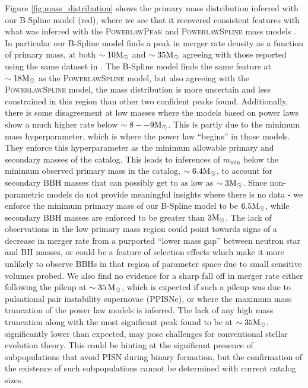 Figure \ref{fig:mass_distribution} shows the primary mass distribution inferred with our B-Spline model (red), where we see that it recovered consistent 
features with what was inferred with the \textsc{PowerlawPeak} and \textsc{PowerlawSpline} mass models \citep{Talbot_2018,o3a_pop,Edelman_2022ApJ,o3b_astro_dist}. 
In particular our B-Spline model finds a peak in merger rate density as a function of primary mass, at both $\sim10{\rm M}_\odot$ and $\sim35{\rm M}_\odot$ agreeing with those 
reported using the same dataset in \citet{o3b_astro_dist}. The B-Spline model finds the same feature at $\sim18{\rm M}_\odot$ as the \textsc{PowerlawSpline} model, but also 
agreeing with the \textsc{PowerlawSpline} model, the mass distribution is more uncertain and less constrained in this region than other two confident peaks found.
Additionally, there is some disagreement at low masses where the models based on power laws show a much higher rate below $\sim8--9{\rm M}_\odot$. This is partly due to  
the minimum mass hyperparameter, which is where the power law ``begins'' in those models. They enforce this hyperparameter as the minimum allowable primary and secondary 
masses of the catalog. This leads to inferences of $m_\mathrm{min}$ below the minimum observed primary mass in the catalog, $\sim 6.4{\rm M}_\odot$, to account for secondary BBH masses 
that can possibly get to as low as $\sim 3{\rm M}_\odot$. Since non-parametric models do not provide meaningful insights where there is no data - we enforce the minimum primary mass of 
our B-Spline model to be $6.5{\rm M}_\odot$, while secondary BBH masses are enforced to be greater than $3{\rm M}_\odot$. The lack of observations in the low primary mass region could 
point towards signs of a decrease in merger rate from a purported ``lower mass gap'' between neutron star and BH masses, or could be a feature of selection effects which make it 
more unlikely to observe BBHs in that region of parameter space due to small sensitive volumes probed. We also find no evidence for a sharp fall off in merger rate either following 
the pileup at $\sim35\,{\rm M}_\odot$, which is expected if such a pileup was due to pulsational pair instability supernovae (PPISNe), or where the maximum mass truncation of the power law models 
is inferred. The lack of any high mass truncation along with the most significant peak found to be at $\sim35{\rm M}_\odot$, significantly lower than expected, may pose challenges for conventional stellar 
evolution theory. This could be hinting at the significant presence of subpopulations that avoid PISN during binary formation, but the confirmation of the existence of such subpopulations 
cannot be determined with current catalog sizes. 

